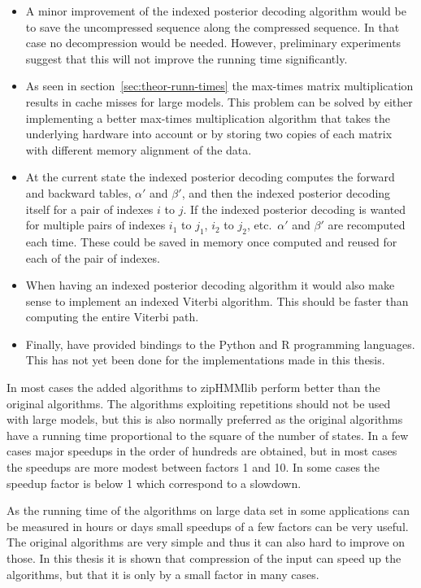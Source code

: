 \begin{itemize}
\item A minor improvement of the indexed posterior decoding algorithm would be
  to save the uncompressed sequence along the compressed sequence. In that case
  no decompression would be needed. However, preliminary experiments suggest
  that this will not improve the running time significantly.
\item As seen in section~\ref{sec:theor-runn-times} the max-times matrix
  multiplication results in cache misses for large models. This problem can be
  solved by either implementing a better max-times multiplication algorithm
  that takes the underlying hardware into account or by storing two copies of
  each matrix with different memory alignment of the data.
\item At the current state the indexed posterior decoding computes the forward
  and backward tables, $\alpha'$ and $\beta'$, and then the indexed posterior
  decoding itself for a pair of indexes $i$ to $j$. If the indexed posterior
  decoding is wanted for multiple pairs of indexes $i_1$ to $j_1$, $i_2$ to
  $j_2$, etc.\ $\alpha'$ and $\beta'$ are recomputed each time. These could be
  saved in memory once computed and reused for each of the pair of indexes.
\item When having an indexed posterior decoding algorithm it would also make
  sense to implement an indexed Viterbi algorithm. This should be faster than
  computing the entire Viterbi path.
\item Finally, \citet{sand2013ziphmmlib} have provided bindings to the Python
  and R programming languages. This has not yet been done for the
  implementations made in this thesis.
\end{itemize}

In most cases the added algorithms to zipHMMlib perform better than the original
algorithms. The algorithms exploiting repetitions should not be used with large models, but this is
also normally preferred as the original algorithms have a running time
proportional to the square of the number of states. In a few cases major
speedups in the order of hundreds are obtained, but in most cases the speedups
are more modest between factors 1 and 10. In some cases the speedup factor is
below 1 which correspond to a slowdown.

As the running time of the algorithms on large data set in some applications
can be measured in hours or days small speedups of a few factors can be very
useful. The original algorithms are very simple and thus it can also hard to
improve on those. In this thesis it is shown that compression of the input can
speed up the algorithms, but that it is only by a small factor in many cases.

